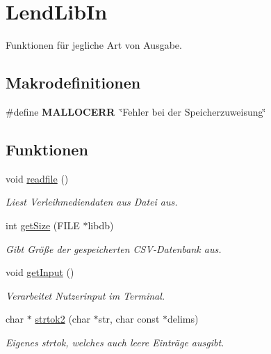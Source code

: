 \hypertarget{group___lend_lib_in}{}\section{Lend\+Lib\+In}
\label{group___lend_lib_in}


Funktionen für jegliche Art von Ausgabe.  


\subsection*{Makrodefinitionen}
\begin{DoxyCompactItemize}
\item 
\#define {\bfseries M\+A\+L\+L\+O\+C\+E\+RR}~\char`\"{}Fehler bei der Speicherzuweisung\char`\"{}\hypertarget{group___lend_lib_in_gafea163490cd0596e2677096aaf92a74f}{}\label{group___lend_lib_in_gafea163490cd0596e2677096aaf92a74f}

\end{DoxyCompactItemize}
\subsection*{Funktionen}
\begin{DoxyCompactItemize}
\item 
void \hyperlink{group___lend_lib_in_gabd7e68463503c5745a70e1d19c66f812}{readfile} ()\hypertarget{group___lend_lib_in_gabd7e68463503c5745a70e1d19c66f812}{}\label{group___lend_lib_in_gabd7e68463503c5745a70e1d19c66f812}

\begin{DoxyCompactList}\small\item\em Liest Verleihmediendaten aus Datei aus. \end{DoxyCompactList}\item 
int \hyperlink{group___lend_lib_in_ga6630e38513358b73fa2ce1c1f6cb71cb}{get\+Size} (F\+I\+LE $\ast$libdb)
\begin{DoxyCompactList}\small\item\em Gibt Größe der gespeicherten C\+S\+V-\/\+Datenbank aus. \end{DoxyCompactList}\item 
void \hyperlink{group___lend_lib_in_ga46d47190cb20b54826fb665f1859968f}{get\+Input} ()
\begin{DoxyCompactList}\small\item\em Verarbeitet Nutzerinput im Terminal. \end{DoxyCompactList}\item 
char $\ast$ \hyperlink{group___lend_lib_in_gaccb55b34bbc589d5c47830fdcd889e17}{strtok2} (char $\ast$str, char const $\ast$delims)
\begin{DoxyCompactList}\small\item\em Eigenes strtok, welches auch leere Einträge ausgibt. \end{DoxyCompactList}\end{DoxyCompactItemize}
